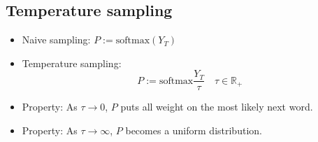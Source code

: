 \documentclass{article}
\begin{document}
\subsection*{Temperature sampling}
\begin{itemize}
\item Naive sampling: $P:=\mathrm{softmax}(Y_T)$
\item Temperature sampling:
$$P:=\mathrm{softmax}\frac{Y_T}{\tau}\quad\tau\in\mathbb{R}_+$$
\item Property: As $\tau\rightarrow 0$, $P$ puts all weight on the most likely next word.
\item Property: As $\tau\rightarrow\infty$, $P$ becomes a uniform distribution.
\end{itemize}
\end{document}
